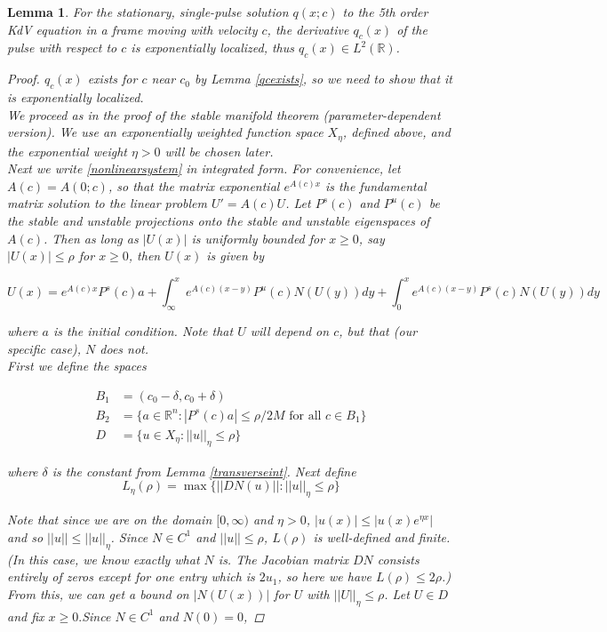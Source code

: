 \documentclass[12pt]{article}
\def\R{{\mathbb R}}
\newtheorem{lemma}{Lemma}
\begin{document}
\begin{lemma}\label{qc}
For the stationary, single-pulse solution $q(x; c)$ to the 5th order KdV equation in a frame moving with velocity $c$, the derivative $q_c(x)$ of the pulse with respect to $c$ is exponentially localized, thus $q_c(x) \in L^2(\R)$.
\begin{proof}
$q_c(x)$ exists for $c$ near $c_0$ by Lemma \ref{qcexists}, so we need to show that it is exponentially localized.\\

We proceed as in the proof of the stable manifold theorem (parameter-dependent version). We use an exponentially weighted function space $X_\eta$, defined above, and the exponential weight $\eta > 0$ will be chosen later.\\

Next we write \eqref{nonlinearsystem} in integrated form. For convenience, let $A(c) = A(0; c)$, so that the matrix exponential $e^{A(c)x}$ is the fundamental matrix solution to the linear problem $U' = A(c) U$. Let $P^s(c)$ and $P^u(c)$ be the stable and unstable projections onto the stable and unstable eigenspaces of $A(c)$. Then as long as $|U(x)|$ is uniformly bounded for $x \geq 0$, say $|U(x)| \leq \rho$ for $x \geq 0$, then $U(x)$ is given by

\[
U(x) = e^{A(c)x} P^s(c) a + \int_\infty^x e^{A(c)(x - y)}P^u(c) N(U(y))dy + \int_0^x e^{A(c)(x - y)}P^s(c) N(U(y))dy
\]

where $a$ is the initial condition. Note that $U$ will depend on $c$, but that (our specific case), $N$ does not.\\

First we define the spaces

\begin{align*}
B_1 &= (c_0 - \delta, c_0 + \delta) \\
B_2 &= \{ a \in \R^n : |P^s(c) a| \leq \rho/2M \text{ for all } c \in B_1\} \\
D &= \{ u \in X_\eta : ||u||_\eta \leq \rho \}
\end{align*}

where $\delta$ is the constant from Lemma \ref{transverseint}. Next define
\[
L_\eta(\rho) = \max \{ || DN(u) || : ||u||_\eta \leq \rho \}
\]

Note that since we are on the domain $[0, \infty)$ and $\eta > 0$, $|u(x)| \leq |u(x)e^{\eta x}|$ and so $||u|| \leq ||u||_\eta$. Since $N \in C^1$ and $||u|| \leq \rho$, $L(\rho)$ is well-defined and finite. (In this case, we know exactly what $N$ is. The Jacobian matrix $DN$ consists entirely of zeros except for one entry which is $2 u_1$, so here we have $L(\rho) \leq 2 \rho$.) From this, we can get a bound on $|N(U(x))|$ for $U$ with $||U||_\eta \leq \rho$. Let $U \in D$ and fix $x \geq 0. $Since $N \in C^1$ and $N(0) = 0$,


\end{proof}
\end{lemma}
\end{document}
